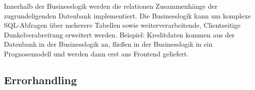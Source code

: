 \documentclass[]{article}
\newenvironment{Shaded}{\begin{snugshade}}{\end{snugshade}}
\newcommand{\CommentTok}[1]{\textcolor[rgb]{0.56,0.35,0.01}{\textit{#1}}}
\newcommand{\KeywordTok}[1]{\textcolor[rgb]{0.13,0.29,0.53}{\textbf{#1}}}
\newcommand{\NormalTok}[1]{#1}
\newcommand{\OperatorTok}[1]{\textcolor[rgb]{0.81,0.36,0.00}{\textbf{#1}}}
\newcommand{\StringTok}[1]{\textcolor[rgb]{0.31,0.60,0.02}{#1}}
\begin{document}
\begin{Shaded}
\end{Shaded}

Innerhalb der Businesslogik werden die relationen Zusammenhänge der
zugrundeligenden Datenbank implementiert. Die Businesslogik kann um
komplexe SQL-Abfragen über meherere Tabellen sowie weiterverarbeitende,
Clientseitige Dunkelverabreitung erweitert werden. Beispiel: Kreditdaten
kommen aus der Datenbank in der Businesslogik an, fließen in der
Businesslogik in ein Prognosemodell und werden dann erst ans Frontend
geliefert.

\hypertarget{errorhandling}{%
\subsection{Errorhandling}\label{errorhandling}}
\end{document}
